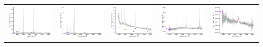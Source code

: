 \begin{center}
\begin{longtable}{l l l l l }
    \includegraphics[width=0.19\linewidth, clip]{Figs/Figs-sdss/spec-0330-52370-0144-SPLUS-n03s21-009182.pdf} & \includegraphics[width=0.19\linewidth, clip]{Figs/Figs-sdss/spec-0376-52143-0160-STRIPE82-0139-046699.pdf} & \includegraphics[width=0.19\linewidth, clip]{Figs/Figs-sdss/spec-0376-52143-0631-STRIPE82-0142-027354.pdf} & \includegraphics[width=0.19\linewidth, clip]{Figs/Figs-sdss/spec-0377-52145-0294-STRIPE82-0141-019376.pdf} & \includegraphics[width=0.19\linewidth, clip]{Figs/Figs-sdss/spec-0377-52145-0484-STRIPE82-0142-017985.pdf} \\

\end{longtable}
\end{center}
